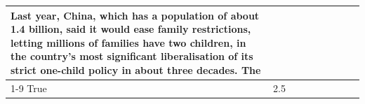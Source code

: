 \begin{table}[H]
\begin{tabular}{lllrlllll}
Last year, China, which has a population of about 1.4 billion, said it would ease family restrictions, letting millions of families have two children, in the country's most significant liberalisation of its strict one-child policy in about three decades. The \\
\cline{1-9}
True & 2.5%
\end{tabular}
\end{table}
